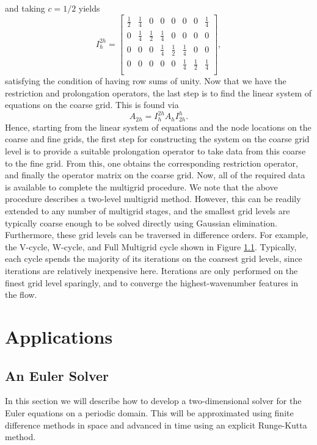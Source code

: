 and taking $c = 1/2$ yields
\begin{equation}
	I_{h}^{2h} =
	\begin{bmatrix}
	    \frac{1}{2} & \frac{1}{4} & 0 & 0 & 0 & 0 & 0 & \frac{1}{4} \\
			0 & \frac{1}{4} & \frac{1}{2} & \frac{1}{4} & 0 & 0 & 0 & 0 \\
			0 & 0 & 0 & \frac{1}{4} & \frac{1}{2} & \frac{1}{4} & 0 & 0 \\
			0 & 0 & 0 & 0 & 0 & \frac{1}{4} & \frac{1}{2} & \frac{1}{4} \\
	\end{bmatrix},
\end{equation}
satisfying the condition of having row sums of unity. Now that we have the restriction and prolongation operators, the last step is to find the linear system of equations on the coarse grid. This is found via
\begin{equation}
	A_{2h} = I_{h}^{2h} A_h I_{2h}^{h}.
\end{equation}
Hence, starting from the linear system of equations and the node locations on the coarse and fine grids, the first step for constructing the system on the coarse grid level is to provide a suitable prolongation operator to take data from this coarse to the fine grid. From this, one obtains the corresponding restriction operator, and finally the operator matrix on the coarse grid. Now, all of the required data is available to complete the multigrid procedure. We note that the above procedure describes a two-level multigrid method. However, this can be readily extended to any number of multigrid stages, and the smallest grid levels are typically coarse enough to be solved directly using Gaussian elimination. Furthermore, these grid levels can be traversed in difference orders. For example, the V-cycle, W-cycle, and Full Multigrid cycle shown in Figure \ref{}. Typically, each cycle spends the majority of its iterations on the coarsest grid levels, since iterations are relatively inexpensive here. Iterations are only performed on the finest grid level sparingly, and to converge the highest-wavenumber features in the flow.

\chapter{Applications}
\section{An Euler Solver}
In this section we will describe how to develop a two-dimensional solver for the Euler equations on a periodic domain. This will be approximated using finite difference methods in space and advanced in time using an explicit Runge-Kutta method. 

